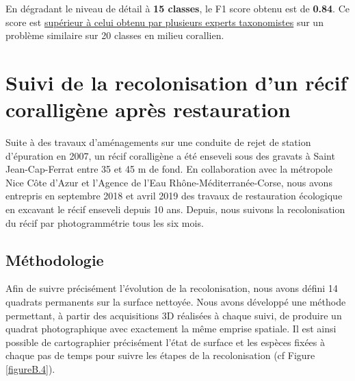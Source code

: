 En dégradant le niveau de détail à \textbf{15 classes}, le F1 score obtenu est de \textbf{0.84}. Ce score est \underline{supérieur à celui obtenu par plusieurs experts taxonomistes} sur un problème similaire sur 20 classes en milieu corallien. 


\section*{Suivi de la recolonisation d’un récif coralligène après restauration}
Suite à des travaux d’aménagements sur une conduite de rejet de station d’épuration en 2007, un récif coralligène a été enseveli sous des gravats à Saint Jean-Cap-Ferrat entre 35 et 45 m de fond. En collaboration avec la métropole Nice Côte d’Azur et l’Agence de l’Eau Rhône-Méditerranée-Corse, nous avons entrepris en septembre 2018 et avril 2019 des travaux de restauration écologique en excavant le récif enseveli depuis 10 ans. Depuis, nous suivons la recolonisation du récif par photogrammétrie tous les six mois.

\subsection*{Méthodologie}
Afin de suivre précisément l’évolution de la recolonisation, nous avons défini 14 quadrats permanents sur la surface nettoyée. Nous avons développé une méthode permettant, à partir des acquisitions 3D réalisées à chaque suivi, de produire un quadrat photographique avec exactement la même emprise spatiale. Il est ainsi possible de cartographier précisément l’état de surface et les espèces fixées à chaque pas de temps pour suivre les étapes de la recolonisation (cf Figure \ref{figureB.4}).


